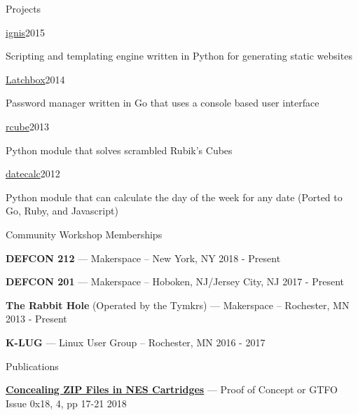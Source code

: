\documentclass{resume} %
\begin{document}
\begin{rSection}{Projects}
\begin{rSubsection}{\href{https://github.com/ViGrey/ignis}{ignis}}{2015}{}{}
\item Scripting and templating engine written in Python for generating static websites
\end{rSubsection}

\begin{rSubsection}{\href{https://github.com/ViGrey/latchbox}{Latchbox}}{2014}{}{}
\item Password manager written in Go that uses a console based user interface
\end{rSubsection}

\begin{rSubsection}{\href{https://github.com/ViGrey/rcube}{rcube}}{2013}{}{}
\item Python module that solves scrambled Rubik's Cubes
\end{rSubsection}

\begin{rSubsection}{\href{https://github.com/ViGrey/datecalc}{datecalc}}{2012}{}{}
\item Python module that can calculate the day of the week for any date (Ported to Go, Ruby, and Javascript)
\end{rSubsection}


\end{rSection}



\begin{rListSection}{Community Workshop Memberships}

\item \textbf{DEFCON 212} --- Makerspace -- New York, NY \hfill 2018 - Present

\item \textbf{DEFCON 201} --- Makerspace -- Hoboken, NJ/Jersey City, NJ  \hfill 2017 - Present

\item \textbf{The Rabbit Hole} (Operated by the Tymkrs) --- Makerspace -- Rochester, MN \hfill 2013 - Present

\item \textbf{K-LUG} --- Linux User Group -- Rochester, MN \hfill 2016 - 2017

\end{rListSection}


\begin{rListSection}{Publications}

\item \textbf{\href{https://www.alchemistowl.org/pocorgtfo/pocorgtfo18.pdf}{Concealing ZIP Files in NES Cartridges}} --- Proof of Concept or GTFO Issue 0x18, 4, pp 17-21  \hfill 2018

\end{rListSection}
\end{document}
